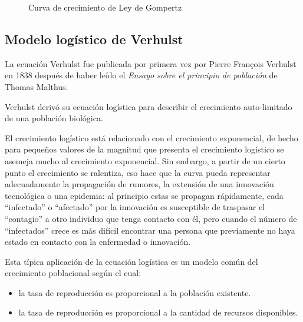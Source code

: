 \begin{figure}[!ht]
\begin{center}
\end{center}\vspace*{-0.6cm}
\caption[Imagen de Oncogenes. Falta poner leyenda]{Curva de crecimiento de Ley de Gompertz}
\label{fig-gompertz}
\end{figure}
\newpage

\subsection{Modelo logístico de Verhulst}
La ecuación Verhulst fue publicada por primera vez por Pierre François Verhulst en 1838 después de haber leído el \textit{Ensayo sobre el principio de población} de Thomas Malthus.

Verhulst derivó su ecuación logística para describir el crecimiento auto-limitado de una población biológica.

El crecimiento logístico está relacionado con el crecimiento exponencial, de hecho para pequeños valores de la magnitud que presenta el crecimiento logístico se asemeja mucho al crecimiento exponencial. Sin embargo, a partir de un cierto punto el crecimiento se ralentiza, eso hace que la curva pueda representar adecuadamente la propagación de rumores, la extensión de una innovación tecnológica o una epidemia: al principio estas se propagan rápidamente, cada ``infectado'' o ``afectado'' por la innovación es susceptible de traspasar el ``contagio'' a otro individuo que tenga contacto con él, pero cuando el número de ``infectados'' crece es más difícil encontrar una persona que previamente no haya estado en contacto con la enfermedad o innovación.

Esta típica aplicación de la ecuación logística es un modelo común del crecimiento poblacional según el cual:
\begin{itemize}
    \item la tasa de reproducción es proporcional a la población existente.
    \item la tasa de reproducción es proporcional a la cantidad de recursos disponibles.
\end{itemize}

